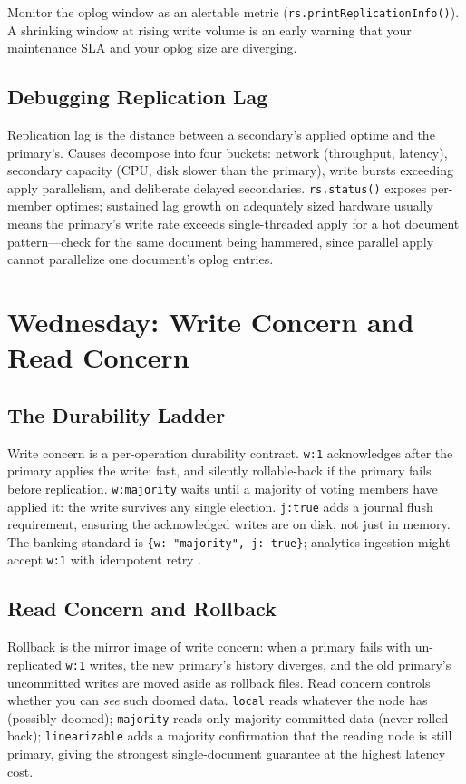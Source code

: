 \begin{tipbox}
Monitor the oplog window as an alertable metric (\texttt{rs.printReplicationInfo()}). A shrinking window at rising write volume is an early warning that your maintenance SLA and your oplog size are diverging.
\end{tipbox}

\subsection{Debugging Replication Lag}
Replication lag is the distance between a secondary's applied optime and the primary's. Causes decompose into four buckets: network (throughput, latency), secondary capacity (CPU, disk slower than the primary), write bursts exceeding apply parallelism, and deliberate delayed secondaries. \texttt{rs.status()} exposes per-member optimes; sustained lag growth on adequately sized hardware usually means the primary's write rate exceeds single-threaded apply for a hot document pattern---check for the same document being hammered, since parallel apply cannot parallelize one document's oplog entries.

\section{Wednesday: Write Concern and Read Concern}
\subsection{The Durability Ladder}
Write concern is a per-operation durability contract. \texttt{w:1} acknowledges after the primary applies the write: fast, and silently rollable-back if the primary fails before replication. \texttt{w:majority} waits until a majority of voting members have applied it: the write survives any single election. \texttt{j:true} adds a journal flush requirement, ensuring the acknowledged writes are on disk, not just in memory. The banking standard is \texttt{\{w: "majority", j: true\}}; analytics ingestion might accept \texttt{w:1} with idempotent retry \cite{mongodbWriteConcernDocs}.

\subsection{Read Concern and Rollback}
Rollback is the mirror image of write concern: when a primary fails with un-replicated \texttt{w:1} writes, the new primary's history diverges, and the old primary's uncommitted writes are moved aside as rollback files. Read concern controls whether you can \emph{see} such doomed data. \texttt{local} reads whatever the node has (possibly doomed); \texttt{majority} reads only majority-committed data (never rolled back); \texttt{linearizable} adds a majority confirmation that the reading node is still primary, giving the strongest single-document guarantee at the highest latency cost.

